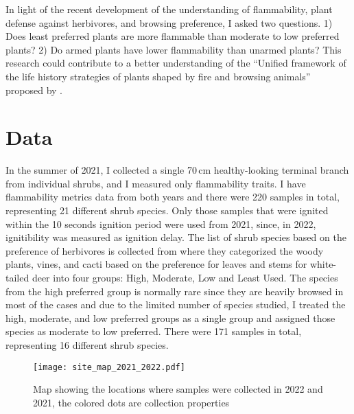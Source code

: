 \documentclass[12pt]{report}
\begin{document}
In light of the recent development of the understanding of flammability, plant defense against herbivores, and browsing preference, I asked two questions. 1) Does least preferred plants are more flammable than moderate to low preferred plants?  2) Do armed plants have lower flammability than unarmed plants? This research could contribute to a better understanding of the ``Unified framework of the life history strategies of plants shaped by fire and browsing animals'' proposed by \citep{archibald2019unified}. \\ 



\section{Data}

In the summer of 2021, I collected a single 70\,cm healthy-looking terminal branch from individual shrubs, and I measured only flammability traits.  I have flammability metrics data from both years and there were 220 samples in total, representing 21 different shrub species. Only those samples that were ignited within the 10 seconds ignition period were used from 2021, since, in 2022, ignitibility was measured as ignition delay. The list of shrub species based on the preference of herbivores is collected from \citep{wright2003white} where they categorized the woody plants, vines, and cacti based on the preference for leaves and stems for white-tailed deer into four groups: High, Moderate, Low and Least Used. The species from the high preferred group is normally rare since they are heavily browsed in most of the cases and due to the limited number of species studied, I treated the high, moderate, and low preferred groups as a single group and assigned those species as moderate to low preferred. There were 171 samples in total, representing 16 different shrub species.\\

\begin{figure}
    \centering
    \texttt{[image: site\_map\_2021\_2022.pdf]}
    \caption{Map showing the locations where samples were collected in 2022 and 2021,
    the colored dots are collection properties}
\end{figure}
\end{document}
